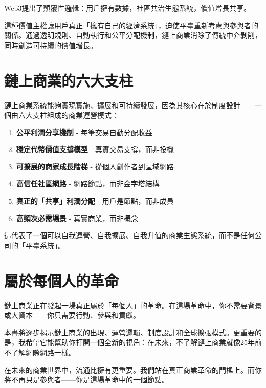 \documentclass[
  Letterpaper,
]{scrbook}
\providecommand{\tightlist}{%
  \setlength{\itemsep}{0pt}\setlength{\parskip}{0pt}}
\begin{document}
Web3提出了顛覆性邏輯：用戶擁有數據，社區共治生態系統，價值增長共享。

這種價值主權讓用戶真正「擁有自己的經濟系統」，迫使平臺重新考慮與參與者的關係。通過透明規則、自動執行和公平分配機制，鏈上商業消除了傳統中介剝削，同時創造可持續的價值增長。

\section*{鏈上商業的六大支柱}\label{ux93c8ux4e0aux5546ux696dux7684ux516dux5927ux652fux67f1}


鏈上商業系統能夠實現實施、擴展和可持續發展，因為其核心在於制度設計------一個由六大支柱組成的商業運營模式：

\begin{enumerate}
\def\labelenumi{\arabic{enumi}.}
\tightlist
\item
  \textbf{公平利潤分享機制} - 每筆交易自動分配收益
\item
  \textbf{穩定代幣價值支撐模型} - 真實交易支撐，而非投機
\item
  \textbf{可擴展的商家成長階梯} - 從個人創作者到區域網路
\item
  \textbf{高信任社區網路} - 網路節點，而非金字塔結構
\item
  \textbf{真正的「共享」利潤分配} - 用戶是節點，而非成員
\item
  \textbf{高頻次必需場景} - 真實商業，而非概念
\end{enumerate}

這代表了一個可以自我運營、自我擴展、自我升值的商業生態系統，而不是任何公司的「平臺系統」。

\section*{屬於每個人的革命}\label{ux5c6cux65bcux6bcfux500bux4ebaux7684ux9769ux547d}


鏈上商業正在發起一場真正屬於「每個人」的革命。在這場革命中，你不需要背景或大資本------你只需要行動、參與和貢獻。

本書將逐步揭示鏈上商業的出現、運營邏輯、制度設計和全球擴張模式。更重要的是，我希望它能幫助你打開一個全新的視角：在未來，不了解鏈上商業就像25年前不了解網際網路一樣。

在未來的商業世界中，流通比擁有更重要。我們站在真正商業革命的門檻上。而你將不再只是參與者------你是這場革命中的一個節點。
\end{document}
